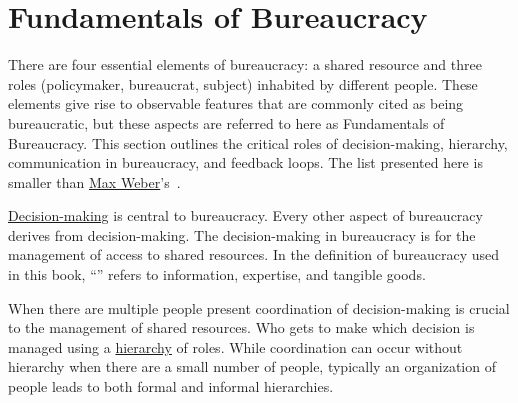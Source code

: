 \section{Fundamentals of Bureaucracy\label{sec:fundamentals-of-b}}

There are four essential elements of bureaucracy: a shared resource and three roles (policymaker, bureaucrat, subject) inhabited by different people. 
These elements give rise to observable features that are commonly cited as being bureaucratic, but these aspects are referred to here as Fundamentals of Bureaucracy.
This section outlines the critical roles of decision-making, hierarchy, communication in bureaucracy, and feedback loops. 
The list presented here is smaller than \href{https://en.wikipedia.org/wiki/Bureaucracy\%23Max_Weber}{Max Weber}'s~\cite{2015_Weber}.

\hyperref[sec:decision-making]{Decision-making}
%
is central to bureaucracy. Every other aspect of bureaucracy derives from decision-making. 
The decision-making in bureaucracy is for the management of access to shared resources. In the definition of bureaucracy used in this book, ``\iftoggle{glossarysubstitutionworks}{\glspl{shared resource}}{shared resources}'' 
\iftoggle{glossaryinmargin}{\marginpar{[Glossary]}}{}%
refers to information, expertise, and tangible goods. %

When there are multiple people present 
coordination of decision-making is crucial to the management of shared resources. Who gets to make which decision is managed using a
\hyperref[sec:hierarchy-of-roles]{hierarchy} of roles.
%
While coordination can occur without hierarchy when there are a small number of people, typically an organization of people leads to both formal and informal hierarchies. 

